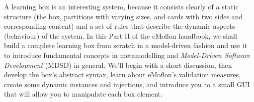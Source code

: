 A learning box is an interesting system, because it consists clearly of a static structure (the box, partitions with varying sizes, and cards with two sides and
corresponding content) and a set of rules that describe the dynamic aspects (behaviour) of the system. In this Part II of the eMoflon handbook, we shall build a 
complete learning box from scratch in a model-driven fashion and use it to introduce fundamental concepts in metamodelling and \emph{Model-Driven Software 
Development} (MDSD) in general. We'll begin with a short discussion, then develop the box's abstract syntax, learn about eMoflon's validation measures, create
some dynamic instances and injections, and introduce you to a small GUI that will allow you to manipulate each box element.
